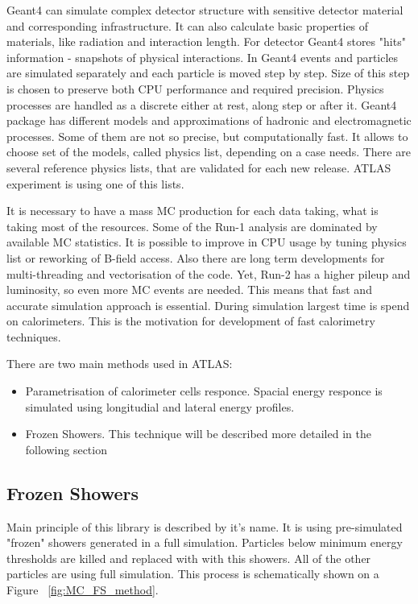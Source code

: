 Geant4 can simulate complex detector structure with sensitive detector material and corresponding infrastructure. It can also calculate basic properties of materials, like radiation and interaction length. For detector Geant4 stores "hits" information  - snapshots of physical interactions. 
In Geant4 events and particles are simulated separately and each particle is moved step by step. Size of this step is chosen to preserve both CPU performance and required precision. Physics processes are handled as a discrete either at rest, along step or after it. Geant4 package has different models and approximations of hadronic and electromagnetic processes. Some of them are not so precise, but computationally fast. It allows to choose set of the models, called physics list, depending on a case needs. There are several reference physics lists, that are validated for each new release. ATLAS experiment is using one of this lists.

It is necessary to have a mass MC production for each data taking, what is taking most of the resources.  Some of the Run-1 analysis are dominated by available MC statistics. 
It is possible to improve in CPU usage by tuning physics list or reworking of B-field access. Also there are long term developments for multi-threading and vectorisation of the code. 
Yet, Run-2 has a higher pileup and luminosity, so even more MC events are needed. This means that fast and accurate simulation approach is essential. During simulation largest time is spend on calorimeters. This is the motivation for development of fast calorimetry techniques.  

There are two main methods used in ATLAS:
\begin{itemize}
\item Parametrisation of calorimeter cells responce. Spacial energy responce is simulated using longitudial and lateral energy profiles.
\item Frozen Showers. This technique will be described more detailed in the following section
\end{itemize}


\subsection{Frozen Showers}
Main principle of this library is described by it's name. It is using pre-simulated "frozen" showers generated in a full simulation. Particles below minimum energy
thresholds are killed and replaced with with this showers. All of the other particles are using full simulation. This process is schematically shown on a Figure ~\ref{fig:MC_FS_method}.
\begin{figure}
\end{figure}

